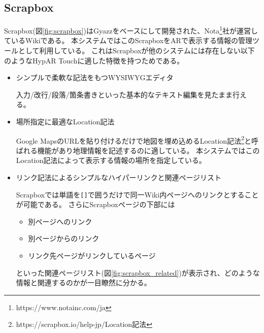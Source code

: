 \subsection{Scrapbox}
Scrapbox(図\ref{fig:scrapbox})はGyazz\cite{Gyazz}をベースにして開発された、Nota\footnote{\textsf{https://www.notainc.com/ja}}社が運営しているWikiである。
本システムではこのScrapboxをARで表示する情報の管理ツールとして利用している。
これはScrapboxが他のシステムには存在しない以下のようなHypAR Touchに適した特徴を持つためである。
\begin{itemize}
  \item シンプルで柔軟な記法をもつWYSIWYGエディタ
  
  入力/改行/段落/箇条書きといった基本的なテキスト編集を見たまま行える。
  
  \item 場所指定に最適なLocation記法
  
  Google MapsのURLを貼り付けるだけで地図を埋め込めるLocation記法\footnote{\textsf{https://scrapbox.io/help-jp/Location記法}}と呼ばれる機能があり地理情報を記述するのに適している。
  本システムではこのLocation記法によって表示する情報の場所を指定している。

  \item リンク記法によるシンプルなハイパーリンクと関連ページリスト
  
  Scrapboxでは単語を\texttt{[]}で囲うだけで同一Wiki内ページへのリンクとすることが可能である。
  さらにScrapboxページの下部には
  \begin{itemize}
      \item 別ページへのリンク
      \item 別ページからのリンク
      \item リンク先ページがリンクしているページ
  \end{itemize}
  といった関連ページリスト(図\ref{fig:scrapbox_related})が表示され、どのような情報と関連するのかが一目瞭然に分かる。

\end{itemize}

